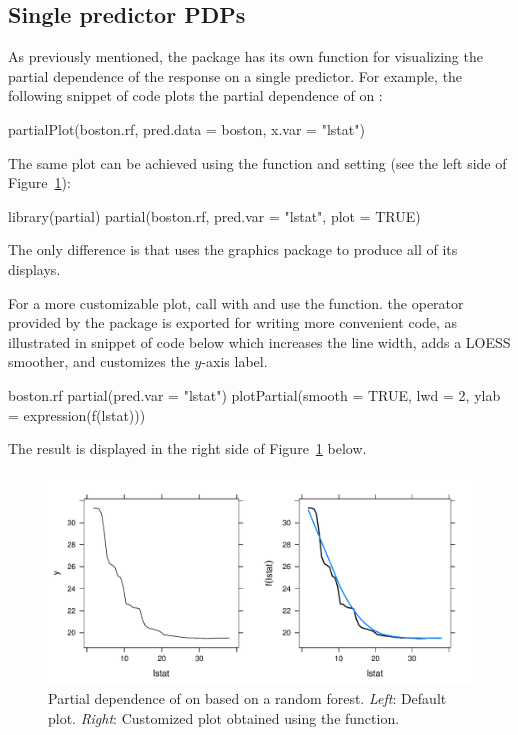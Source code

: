 \subsection{Single predictor PDPs}

As previously mentioned, the  package has its own  function for visualizing the partial dependence of the response on a single predictor. For example, the following snippet of code plots the partial dependence of  on :
\begin{example}
partialPlot(boston.rf, pred.data = boston, x.var = "lstat")
\end{example}
The same plot can be achieved using the  function and setting  (see the left side of Figure~\ref{fig:pd_lstat}):
\begin{example}
library(partial)
partial(boston.rf, pred.var = "lstat", plot = TRUE)
\end{example}
The only difference is that  uses the  graphics package to produce all of its displays.

For a more customizable plot, call  with  and use the  function.  the  operator \code{\%>\%} provided by the  package \citep{magrittr-pkg} is exported for writing more convenient code, as illustrated in snippet of code below which increases the line width, adds a LOESS smoother, and customizes the $y$-axis label.
\begin{example}
boston.rf %
  partial(pred.var = "lstat") %
  plotPartial(smooth = TRUE, lwd = 2, ylab = expression(f(lstat)))
\end{example}
The result is displayed in the right side of Figure~\ref{fig:pd_lstat} below.

\begin{figure}[htbp]
  \centering
  \includegraphics[width=1.0\linewidth]{pd_lstat}
  \caption{Partial dependence of  on  based on a random forest. \textit{Left}: Default plot. \textit{Right}: Customized plot obtained using the  function.}
  \label{fig:pd_lstat}
\end{figure}



